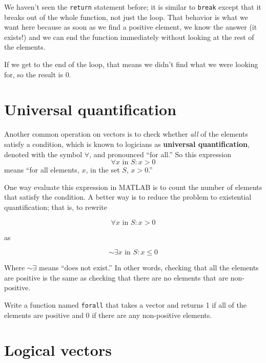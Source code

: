 \documentclass[
]{book}
\numberwithin{Answer}{chapter}
\numberwithin{Exercise}{chapter}
\begin{document}
We haven't seen the {\tt return} statement before; it is similar
to {\tt break} except that it breaks out of the whole function, not
just the loop.  That behavior is what we want here because as soon
as we find a positive element, we know the answer (it exists!) and
we can end the function immediately without looking at the rest
of the elements.

If we get to the end of the loop, that means we didn't find what
we were looking for, so the result is 0.



\section{Universal quantification}

Another common operation on vectors is to check whether {\em all}
of the elements satisfy a condition, which is known to
logicians as {\bf universal quantification}, denoted with
the symbol $\forall$, and pronounced ``for all.''  So this
expression
%
\[ \forall x \mbox{~in~} S: x>0 \]
%
means ``for all elements, $x$, in the set $S$, $x>0$.''

One way evaluate this expression in MATLAB is to
count the number of elements that satisfy the condition.
A better way is to reduce the problem to
existential quantification; that is, to rewrite

\begin{equation}
\forall x \mbox{~in~} S: x>0
\end{equation}

as

\begin{equation}
\sim \exists x \mbox{~in~} S: x \le 0
\end{equation}

Where $\sim \exists$ means ``does not exist.''
In other words, checking that all the elements are positive is
the same as checking that there are no elements
that are non-positive.

\begin{ex}
Write a function named {\tt forall} that
takes a vector and returns 1 if all of the elements are positive
and 0 if there are any non-positive elements.
\end{ex}




\section{Logical vectors}
\end{document}
